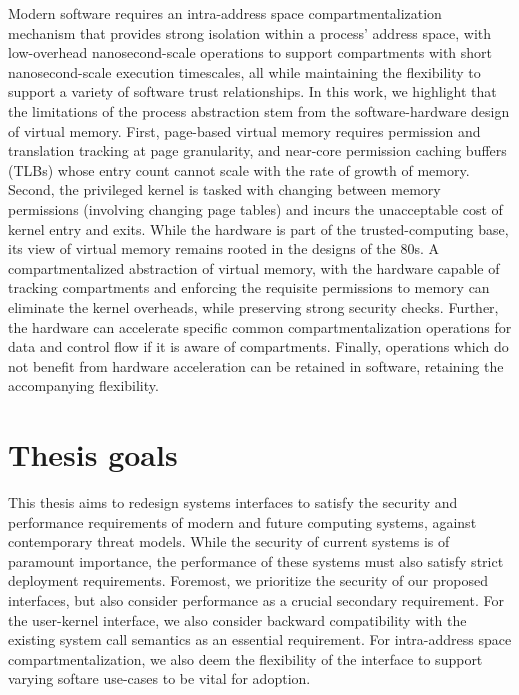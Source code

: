 Modern software requires an intra-address space compartmentalization mechanism
that provides strong isolation within a process' address space, with
low-overhead nanosecond-scale operations to support compartments with short
nanosecond-scale execution timescales, all while maintaining the flexibility
to support a variety of software trust relationships.
In this work, we highlight that the limitations of the process abstraction
stem from the software-hardware design of virtual memory.
First, page-based virtual memory requires permission and translation tracking
at page granularity, and near-core permission caching buffers (TLBs) whose
entry count cannot scale with the rate of growth of memory.
Second, the privileged kernel is tasked with changing between memory 
permissions (involving changing page tables) and incurs the unacceptable
cost of kernel entry and exits.
While the hardware is part of the trusted-computing base, its view of virtual
memory remains rooted in the designs of the 80s.
A compartmentalized abstraction of virtual memory, with the hardware capable
of tracking compartments and enforcing the requisite permissions to memory
can eliminate the kernel overheads, while preserving strong security checks.
Further, the hardware can accelerate specific common compartmentalization
operations for data and control flow if it is aware of compartments.
Finally, operations which do not benefit from hardware acceleration can
be retained in software, retaining the accompanying flexibility.

\section{Thesis goals}

This thesis aims to redesign systems interfaces to satisfy the
security and performance requirements of modern and future computing 
systems, against contemporary threat models.
While the security of current systems is of paramount importance, the
performance of these systems must also satisfy strict deployment 
requirements.
Foremost, we prioritize the security of our proposed interfaces, but also
consider performance as a crucial secondary requirement.
For the user-kernel interface, we also consider backward compatibility with
the existing system call semantics as an essential requirement.
For intra-address space compartmentalization, we also deem the flexibility
of the interface to support varying softare use-cases to be vital for adoption.

